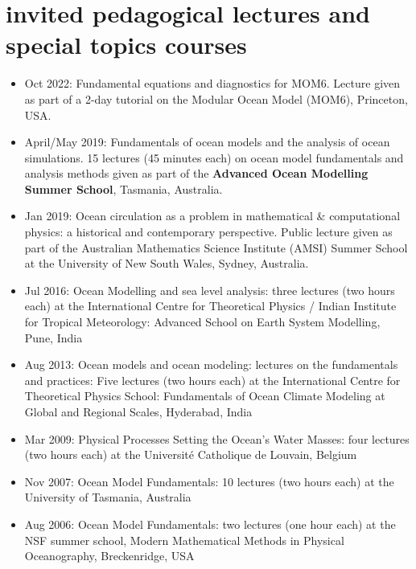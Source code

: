 \section*{\sc  \color{Maroon}  invited pedagogical lectures and special topics courses}
\vspace{-.3cm}

\begin{itemize}[leftmargin=*]

\item Oct 2022: {\sc Fundamental equations and diagnostics for MOM6}. Lecture given as part of a 2-day tutorial on  the Modular Ocean Model (MOM6), Princeton, USA.  

\item April/May 2019: {\sc Fundamentals of ocean models and the analysis of ocean simulations}. 15 lectures (45 minutes each) on ocean model fundamentals and analysis methods given as part of the {\bf Advanced Ocean Modelling Summer School}, Tasmania, Australia. 

\item Jan 2019: {\sc Ocean circulation
as a problem in mathematical \& computational physics:  a historical and contemporary  perspective}. Public lecture given as part of the Australian Mathematics Science Institute (AMSI) Summer School at the University of New South Wales, Sydney, Australia. 

\item Jul 2016: {\sc Ocean Modelling and sea level analysis}: three lectures (two hours each) at the International Centre for Theoretical Physics / Indian Institute for Tropical Meteorology: {\sc Advanced School on Earth System Modelling}, Pune, India

\item Aug 2013: {\sc Ocean models and ocean modeling: lectures on the fundamentals and practices}: Five lectures (two hours each) at the International Centre for Theoretical Physics School: {\sc Fundamentals of Ocean Climate Modeling at Global and Regional Scales}, Hyderabad, India

\item Mar 2009: {\sc Physical Processes Setting the Ocean's Water Masses}: four lectures (two hours each) at the Universit\'e Catholique de Louvain, Belgium

\item Nov 2007: {\sc Ocean Model Fundamentals}: 10 lectures (two hours each) at the University of Tasmania, Australia 

\item Aug 2006: {\sc Ocean Model Fundamentals}: two lectures (one hour each) at the NSF summer school, {\sc Modern Mathematical Methods in
Physical Oceanography}, Breckenridge, USA


\end{itemize}
